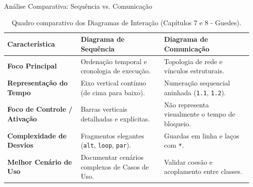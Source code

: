 \documentclass[10pt]{beamer}
\begin{document}
\begin{frame}{Análise Comparativa: Sequência vs. Comunicação}
    \begin{table}
        \centering
        \scriptsize
        \begin{tabular}{p{3.2cm} p{3.8cm} p{3.8cm}}
            \toprule
            \textbf{Característica} & \textbf{Diagrama de Sequência} & \textbf{Diagrama de Comunicação} \\
            \midrule
            \textbf{Foco Principal} & Ordenação temporal e cronologia de execução. & Topologia de rede e vínculos estruturais. \\
            \addlinespace
            \textbf{Representação do Tempo} & Eixo vertical contínuo (de cima para baixo). & Numeração sequencial aninhada (\texttt{1.1}, \texttt{1.2}). \\
            \addlinespace
            \textbf{Foco de Controle / Ativação} & Barras verticais detalhadas e explícitas. & Não representa visualmente o tempo de bloqueio. \\
            \addlinespace
            \textbf{Complexidade de Desvios} & Fragmentos elegantes (\texttt{alt}, \texttt{loop}, \texttt{par}). & Guardas em linha e laços com \texttt{*}. \\
            \addlinespace
            \textbf{Melhor Cenário de Uso} & Documentar cenários complexos de Casos de Uso. & Validar coesão e acoplamento entre classes. \\
            \bottomrule
        \end{tabular}
        \caption{Quadro comparativo dos Diagramas de Interação (Capítulos 7 e 8 - Guedes).}
    \end{table}
\end{frame}
\end{document}
